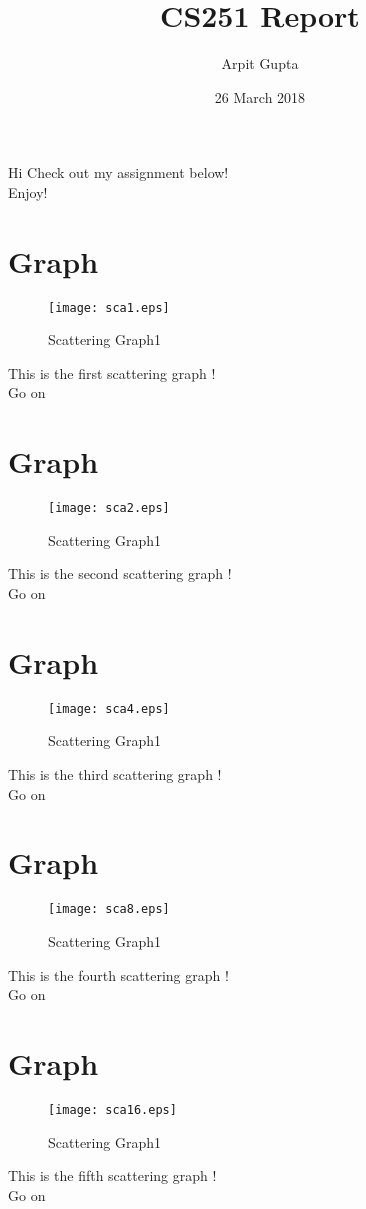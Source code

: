 \documentclass{article}
\title{CS251 Report}
\author{Arpit Gupta }
\date{26 March 2018}
\begin{document}
\maketitle

Hi Check out my assignment below!\\
Enjoy!\\
\section{Graph}
\begin{figure}[H]
    \centering
    \texttt{[image: sca1.eps]}
    \caption{Scattering Graph1}
    \label{fig:my_label}
\end{figure}
This is the first scattering graph !\\
Go on\\
\section{Graph}
\begin{figure}[H]
    \centering
    \texttt{[image: sca2.eps]}
    \caption{Scattering Graph1}
    \label{fig:my_label}
\end{figure}
This is the second scattering graph !\\
Go on\\
\section{Graph}
\begin{figure}[H]
    \centering
    \texttt{[image: sca4.eps]}
    \caption{Scattering Graph1}
    \label{fig:my_label}
\end{figure}
This is the third scattering graph !\\
Go on\\
\section{Graph}
\begin{figure}[H]
    \centering
    \texttt{[image: sca8.eps]}
    \caption{Scattering Graph1}
    \label{fig:my_label}
\end{figure}
This is the fourth scattering graph !\\
Go on\\
\section{Graph}
\begin{figure}[H]
    \centering
    \texttt{[image: sca16.eps]}
    \caption{Scattering Graph1}
    \label{fig:my_label}
\end{figure}
This is the fifth scattering graph !\\
Go on\\
\end{document}
